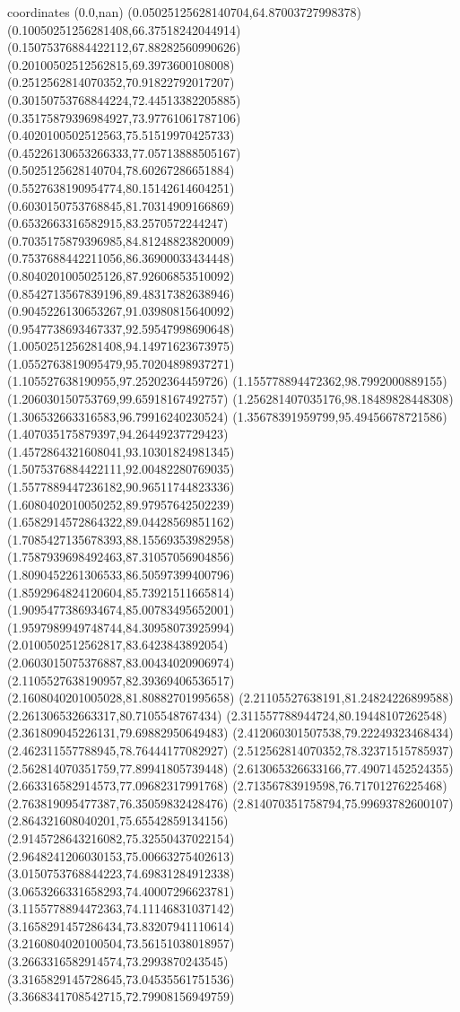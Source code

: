 coordinates {%
(0.0,nan)
(0.05025125628140704,64.87003727998378)
(0.10050251256281408,66.37518242044914)
(0.15075376884422112,67.88282560990626)
(0.20100502512562815,69.3973600108008)
(0.2512562814070352,70.91822792017207)
(0.30150753768844224,72.44513382205885)
(0.35175879396984927,73.97761061787106)
(0.4020100502512563,75.51519970425733)
(0.45226130653266333,77.05713888505167)
(0.5025125628140704,78.60267286651884)
(0.5527638190954774,80.15142614604251)
(0.6030150753768845,81.70314909166869)
(0.6532663316582915,83.2570572244247)
(0.7035175879396985,84.81248823820009)
(0.7537688442211056,86.36900033434448)
(0.8040201005025126,87.92606853510092)
(0.8542713567839196,89.48317382638946)
(0.9045226130653267,91.03980815640092)
(0.9547738693467337,92.59547998690648)
(1.0050251256281408,94.14971623673975)
(1.0552763819095479,95.70204898937271)
(1.105527638190955,97.25202364459726)
(1.155778894472362,98.7992000889155)
(1.206030150753769,99.65918167492757)
(1.256281407035176,98.18489828448308)
(1.306532663316583,96.79916240230524)
(1.35678391959799,95.49456678721586)
(1.407035175879397,94.26449237729423)
(1.4572864321608041,93.10301824981345)
(1.5075376884422111,92.00482280769035)
(1.5577889447236182,90.96511744823336)
(1.6080402010050252,89.97957642502239)
(1.6582914572864322,89.04428569851162)
(1.7085427135678393,88.15569353982958)
(1.7587939698492463,87.31057056904856)
(1.8090452261306533,86.50597399400796)
(1.8592964824120604,85.73921511665814)
(1.9095477386934674,85.00783495652001)
(1.9597989949748744,84.30958073925994)
(2.0100502512562817,83.6423843892054)
(2.0603015075376887,83.00434020906974)
(2.1105527638190957,82.39369406536517)
(2.1608040201005028,81.80882701995658)
(2.21105527638191,81.24824226899588)
(2.261306532663317,80.7105548767434)
(2.311557788944724,80.19448107262548)
(2.361809045226131,79.69882950649483)
(2.412060301507538,79.22249323468434)
(2.462311557788945,78.76444177082927)
(2.512562814070352,78.32371515785937)
(2.562814070351759,77.89941805739448)
(2.613065326633166,77.49071452524355)
(2.663316582914573,77.09682317991768)
(2.71356783919598,76.71701276225468)
(2.763819095477387,76.35059832428476)
(2.814070351758794,75.99693782600107)
(2.864321608040201,75.65542859134156)
(2.9145728643216082,75.32550437022154)
(2.9648241206030153,75.00663275402613)
(3.0150753768844223,74.69831284912338)
(3.0653266331658293,74.40007296623781)
(3.1155778894472363,74.11146831037142)
(3.1658291457286434,73.83207941110614)
(3.2160804020100504,73.56151038018957)
(3.2663316582914574,73.2993870243545)
(3.3165829145728645,73.04535561751536)
(3.3668341708542715,72.79908156949759)
}
